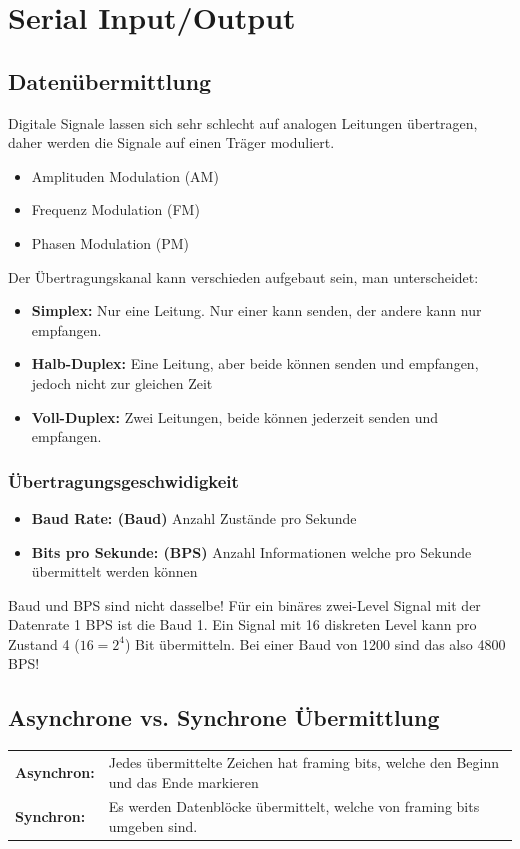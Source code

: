 \section{Serial Input/Output}
\subsection{Datenübermittlung}
Digitale Signale lassen sich sehr schlecht auf analogen Leitungen übertragen, daher werden die Signale auf einen Träger moduliert.
\begin{itemize}
  \item Amplituden Modulation (AM)
  \item Frequenz Modulation (FM)
  \item Phasen Modulation (PM)
\end{itemize}

Der Übertragungskanal kann verschieden aufgebaut sein, man unterscheidet:
\begin{itemize}
  \item \textbf{Simplex:} Nur eine Leitung. Nur einer kann senden, der andere kann nur empfangen.
  \item \textbf{Halb-Duplex:} Eine Leitung, aber beide können senden und empfangen, jedoch nicht zur gleichen Zeit
  \item \textbf{Voll-Duplex:} Zwei Leitungen, beide können jederzeit senden und empfangen.
\end{itemize}

\subsubsection{Übertragungsgeschwidigkeit}
\begin{itemize}
  \item \textbf{Baud Rate: (Baud)} Anzahl Zustände pro Sekunde
  \item \textbf{Bits pro Sekunde: (BPS)} Anzahl Informationen welche pro Sekunde übermittelt werden können
\end{itemize}
Baud und BPS sind nicht dasselbe! Für ein binäres zwei-Level Signal mit der Datenrate 1 BPS ist die Baud 1.
Ein Signal mit 16 diskreten Level kann pro Zustand 4 ($16=2^4$) Bit übermitteln. Bei einer Baud von 1200 sind das also 4800 BPS! 

\subsection{Asynchrone vs. Synchrone Übermittlung}
\begin{tabular}{ll}
	\textbf{Asynchron:}	& Jedes übermittelte Zeichen hat framing bits, welche den Beginn und das Ende markieren \\
	\textbf{Synchron:}	& Es werden Datenblöcke übermittelt, welche von framing	bits umgeben sind.
\end{tabular}

